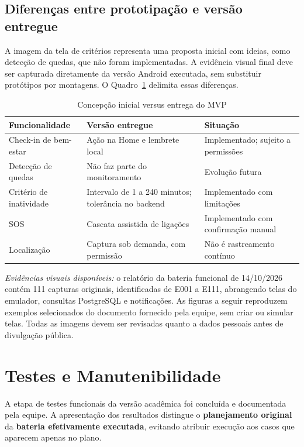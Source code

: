 \subsection{Diferenças entre prototipação e versão entregue}

A imagem da tela de critérios representa uma proposta inicial com ideias, como detecção de quedas, que não foram implementadas. A evidência visual final deve ser capturada diretamente da versão Android executada, sem substituir protótipos por montagens. O Quadro~\ref{tab_proto_vs_mvp} delimita essas diferenças.

\begin{table}[H]
\caption{Concepção inicial versus entrega do MVP}
\label{tab_proto_vs_mvp}
\centering\footnotesize
\begin{tabular}{p{4cm}p{5cm}p{4cm}}\hline
\textbf{Funcionalidade} & \textbf{Versão entregue} & \textbf{Situação}
\\\hline
Check-in de bem-estar & Ação na Home e lembrete local & Implementado; sujeito a permissões \\\hline
Detecção de quedas & Não faz parte do monitoramento & Evolução futura \\\hline
Critério de inatividade & Intervalo de 1 a 240 minutos; tolerância no backend & Implementado com limitações \\\hline
SOS & Cascata assistida de ligações & Implementado com confirmação manual \\\hline
Localização & Captura sob demanda, com permissão & Não é rastreamento contínuo \\\hline
\end{tabular}
\end{table}

\noindent\textit{Evidências visuais disponíveis:} o relatório da bateria funcional de 14/10/2026 contém 111 capturas originais, identificadas de E001 a E111, abrangendo telas do emulador, consultas PostgreSQL e notificações. As figuras a seguir reproduzem exemplos selecionados do documento fornecido pela equipe, sem criar ou simular telas. Todas as imagens devem ser revisadas quanto a dados pessoais antes de divulgação pública.

\section{Testes e Manutenibilidade}

A etapa de testes funcionais da versão acadêmica foi concluída e documentada pela equipe. A apresentação dos resultados distingue o \textbf{planejamento original} da \textbf{bateria efetivamente executada}, evitando atribuir execução aos casos que aparecem apenas no plano.

